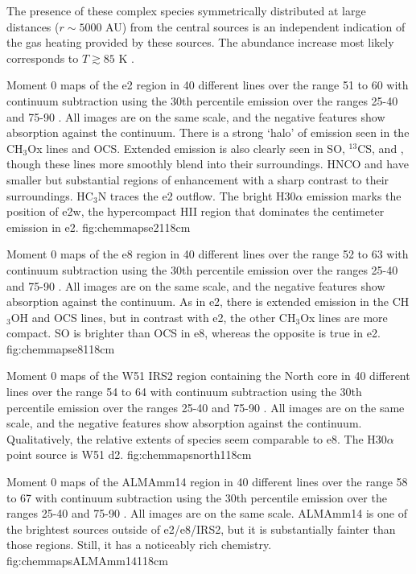 \documentclass{emulateapj}
\begin{document}
The presence of these complex species symmetrically distributed at large
distances ($r\sim5000$ AU) from the central sources is an independent
indication of the gas heating provided by these sources.  The abundance
increase most likely corresponds to $T\gtrsim85$ K \citep{Green2009a}.


{Moment 0 maps of the e2 region in 40 different lines over the range 51 to 60
\kms with continuum subtraction using the 30th percentile emission
over the ranges 25-40 and 75-90 \kms.  All images are on the same scale, and
the negative features show absorption against the continuum.  There
is a strong `halo' of emission seen in the CH$_3$Ox lines and OCS.  Extended
emission is also clearly seen in SO, $^{13}$CS, and \formaldehyde, though these
lines more smoothly blend into their surroundings.  HNCO and \formamide have
smaller but substantial regions of enhancement with a sharp contrast to their
surroundings.  HC$_3$N traces the e2 outflow.  The bright H30$\alpha$ emission
marks the position of e2w, the hypercompact HII region that dominates the
centimeter emission in e2.
}{fig:chemmapse2}{1}{18cm}

{Moment 0 maps of the e8 region in 40 different lines over the range 52 to 63
\kms with continuum subtraction using the 30th percentile emission
over the ranges 25-40 and 75-90 \kms.  All images are on the same scale, and
the negative features show absorption against the continuum.  As in e2,
there is extended emission in the CH$_3$OH and OCS lines, but in contrast with e2,
the other CH$_3$Ox lines are more compact. SO is brighter than OCS in e8, 
whereas the opposite is true in e2.
}{fig:chemmapse8}{1}{18cm}

{Moment 0 maps of the W51 IRS2 region containing the North core in 40 different
lines over the range 54 to 64 \kms with continuum subtraction using the 30th
percentile emission over the ranges 25-40 and 75-90 \kms.  All images are on
the same scale, and the negative features show absorption against the
continuum.  Qualitatively, the relative extents of species seem comparable to
e8.  The H30$\alpha$ point source is W51 d2.
}{fig:chemmapsnorth}{1}{18cm}

{Moment 0 maps of the ALMAmm14 region in 40 different lines over the range 58 to 67
\kms with continuum subtraction using the 30th percentile emission
over the ranges 25-40 and 75-90 \kms.  All images are on the same scale. 
ALMAmm14 is one of the brightest sources outside of e2/e8/IRS2, but
it is substantially fainter than those regions.  Still, it has a noticeably
rich chemistry.
}{fig:chemmapsALMAmm14}{1}{18cm}
\end{document}
